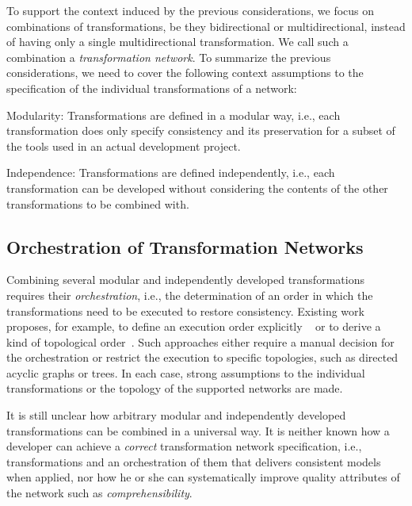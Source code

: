 To support the context induced by the previous considerations, we focus on combinations of transformations, be they bidirectional or multidirectional, instead of having only a single multidirectional transformation.
We call such a combination a \emph{transformation network}.
To summarize the previous considerations, we need to cover the following context assumptions to the specification of the individual transformations of a network:
\begin{properdescription}
    \item[Modularity:] Transformations are defined in a modular way, i.e., each transformation does only specify consistency and its preservation for a subset of the tools used in an actual development project.
    \item[Independence:] Transformations are defined independently, i.e., each transformation can be developed without considering the contents of the other transformations to be combined with.
\end{properdescription}


\subsection{Orchestration of Transformation Networks}
\label{chap:introduction:consistency:orchestration}

Combining several modular and independently developed transformations requires their \emph{orchestration}, i.e., the determination of an order in which the transformations need to be executed to restore consistency.
Existing work proposes, for example, to define an execution order explicitly ~\cite{pilgrim2008a, vanhooff2007UniTI-MODELS} or to derive a kind of topological order~\cite{stevens2020BidirectionalTransformationLarge-SoSym}.
Such approaches either require a manual decision for the orchestration or restrict the execution to specific topologies, such as directed acyclic graphs or trees. %
In each case, strong assumptions to the individual transformations or the topology of the supported networks are made.

It is still unclear how arbitrary modular and independently developed transformations can be combined in a universal way.
It is neither known how a developer can achieve a \emph{correct} transformation network specification, i.e., transformations and an orchestration of them that delivers consistent models when applied, nor how he or she can systematically improve quality attributes of the network such as %
\emph{comprehensibility}.

